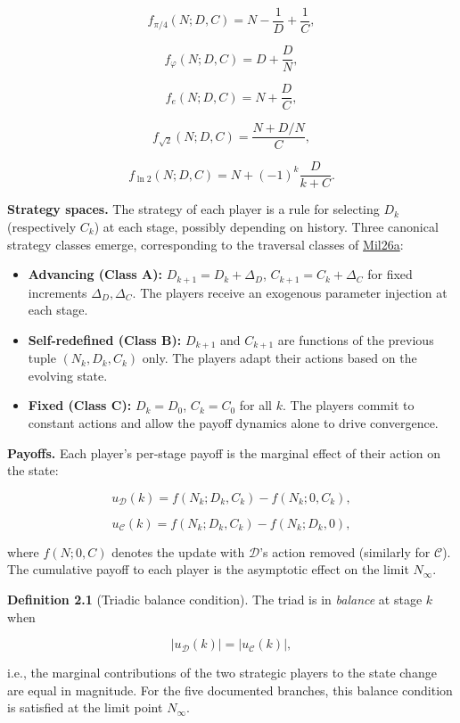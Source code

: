 \documentclass[
  11pt,
  letterpaper,
]{article}
\providecommand{\tightlist}{%
  \setlength{\itemsep}{0pt}\setlength{\parskip}{0pt}}
\begin{document}
\[f_{\pi/4}(N; D, C) = N - \frac{1}{D} + \frac{1}{C},\]

\[f_{\varphi}(N; D, C) = D + \frac{D}{N},\]

\[f_{e}(N; D, C) = N + \frac{D}{C},\]

\[f_{\sqrt{2}}(N; D, C) = \frac{N + D/N}{C},\]

\[f_{\ln 2}(N; D, C) = N + (-1)^k \frac{D}{k + C}.\]

\textbf{Strategy spaces.} The strategy of each player is a rule for
selecting \(D_k\) (respectively \(C_k\)) at each stage, possibly
depending on history. Three canonical strategy classes emerge,
corresponding to the traversal classes of
\href{https://github.com/baardev/truevalue/blob/main/docnav/Research/papers/1_recursive-tholonic-five-constants/1_recursive-tholonic-five-constants.pdf}{Mil26a}:

\begin{itemize}
\tightlist
\item
  \textbf{Advancing (Class A):} \(D_{k+1} = D_k + \Delta_D\),
  \(C_{k+1} = C_k + \Delta_C\) for fixed increments
  \(\Delta_D, \Delta_C\). The players receive an exogenous parameter
  injection at each stage.
\item
  \textbf{Self-redefined (Class B):} \(D_{k+1}\) and \(C_{k+1}\) are
  functions of the previous tuple \((N_k, D_k, C_k)\) only. The players
  adapt their actions based on the evolving state.
\item
  \textbf{Fixed (Class C):} \(D_k = D_0\), \(C_k = C_0\) for all \(k\).
  The players commit to constant actions and allow the payoff dynamics
  alone to drive convergence.
\end{itemize}

\textbf{Payoffs.} Each player's per-stage payoff is the marginal effect
of their action on the state:

\[u_{\mathcal{D}}(k) = f(N_k; D_k, C_k) - f(N_k; 0, C_k),\]

\[u_{\mathcal{C}}(k) = f(N_k; D_k, C_k) - f(N_k; D_k, 0),\]

where \(f(N; 0, C)\) denotes the update with \(\mathcal{D}\)'s action
removed (similarly for \(\mathcal{C}\)). The cumulative payoff to each
player is the asymptotic effect on the limit \(N_\infty\).

\textbf{Definition 2.1} (Triadic balance condition). The triad is in
\emph{balance} at stage \(k\) when

\[|u_{\mathcal{D}}(k)| = |u_{\mathcal{C}}(k)|,\]

i.e., the marginal contributions of the two strategic players to the
state change are equal in magnitude. For the five documented branches,
this balance condition is satisfied at the limit point \(N_\infty\).
\end{document}
